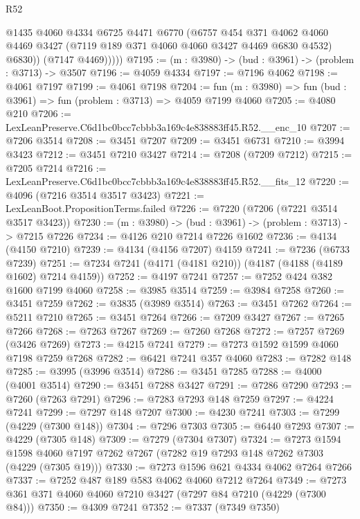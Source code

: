 \begin{lexlean}{R52}
\begin{coremodule}
              @1435
              @4060
              @4334
              @6725
              @4471
              @6770
              (@6757
                @454
                @371
                @4062
                @4060
                @4469
                @3427
                (@7119 @189 @371 @4060 @4060 @3427 @4469 @6830 @4532)
                @6830))
            (@7147 @4469)))))
@7195 := (m : @3980) -> (bud : @3961) -> (problem : @3713) -> @3507
@7196 := @4059 @4334
@7197 := @7196 @4062
@7198 := @4061 @7197
@7199 := @4061 @7198
@7204 := fun (m : @3980) => fun (bud : @3961) => fun (problem : @3713) => @4059 @7199 @4060
@7205 := @4080 @210
@7206 := LexLeanPreserve.C6d1bc0bcc7cbbb3a169c4e838883ff45.R52.__enc_10
@7207 := @7206 @3514
@7208 := @3451 @7207
@7209 := @3451 @6731
@7210 := @3994 @3423
@7212 := @3451 @7210 @3427
@7214 := @7208 (@7209 @7212)
@7215 := @7205 @7214
@7216 := LexLeanPreserve.C6d1bc0bcc7cbbb3a169c4e838883ff45.R52.__fits_12
@7220 := @4096 (@7216 @3514 @3517 @3423)
@7221 := LexLeanBoot.PropositionTerms.failed
@7226 := @7220 (@7206 (@7221 @3514 @3517 @3423))
@7230 := (m : @3980) -> (bud : @3961) -> (problem : @3713) -> @7215 @7226
@7234 := @4126 @210 @7214 @7226 @1602
@7236 := @4134 (@4150 @7210)
@7239 := @4134 (@4156 @7207) @4159
@7241 := @7236 (@6733 @7239)
@7251 := @7234 @7241 (@4171 (@4181 @210)) (@4187 (@4188 (@4189 @1602) @7214 @4159))
@7252 := @4197 @7241
@7257 := @7252 @424 @382 @1600 @7199 @4060
@7258 := @3985 @3514
@7259 := @3984 @7258
@7260 := @3451 @7259
@7262 := @3835 (@3989 @3514)
@7263 := @3451 @7262
@7264 := @5211 @7210
@7265 := @3451 @7264
@7266 := @7209 @3427
@7267 := @7265 @7266
@7268 := @7263 @7267
@7269 := @7260 @7268
@7272 := @7257 @7269 (@3426 @7269)
@7273 := @4215 @7241
@7279 := @7273 @1592 @1599 @4060 @7198 @7259 @7268
@7282 := @6421 @7241 @357 @4060
@7283 := @7282 @148
@7285 := @3995 (@3996 @3514)
@7286 := @3451 @7285
@7288 := @4000 (@4001 @3514)
@7290 := @3451 @7288 @3427
@7291 := @7286 @7290
@7293 := @7260 (@7263 @7291)
@7296 := @7283 @7293 @148 @7259
@7297 := @4224 @7241
@7299 := @7297 @148 @7207
@7300 := @4230 @7241
@7303 := @7299 (@4229 (@7300 @148))
@7304 := @7296 @7303
@7305 := @6440 @7293
@7307 := @4229 (@7305 @148)
@7309 := @7279 (@7304 @7307)
@7324 := @7273
    @1594
    @1598
    @4060
    @7197
    @7262
    @7267
    (@7282 @19 @7293 @148 @7262 @7303 (@4229 (@7305 @19)))
@7330 := @7273 @1596 @621 @4334 @4062 @7264 @7266
@7337 := @7252 @487 @189 @583 @4062 @4060 @7212 @7264
@7349 := @7273 @361 @371 @4060 @4060 @7210 @3427 (@7297 @84 @7210 (@4229 (@7300 @84)))
@7350 := @4309 @7241
@7352 := @7337 (@7349 @7350)

\end{coremodule}
\end{lexlean}
